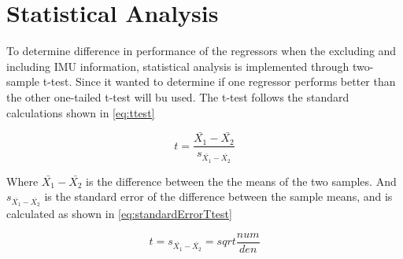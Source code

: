 \section{Statistical Analysis}

To determine difference in performance of the regressors when the excluding and including IMU information, statistical analysis is implemented through two-sample t-test. 
Since it wanted to determine if one regressor performs better than the other one-tailed t-test will bu used. 
The t-test follows the standard calculations shown in \eqref{eq:ttest}

\begin{equation} \label{eq:ttest}
	t = \frac{\bar{X_1}-\bar{X_2}}{s_{\bar{X_1}-\bar{X_2}}}
\end{equation}

Where $\bar{X_1}-\bar{X_2}$ is the difference between the the means of the two samples. And $s_{\bar{X_1}-\bar{X_2}}$ is the standard error of the difference between the sample means, and is calculated as shown in \eqref{eq:standardErrorTtest}

\begin{equation} \label{eq:standardErrorTtest}
t = s_{\bar{X_1}-\bar{X_2}} = sqrt{\frac{num}{den}}
\end{equation}